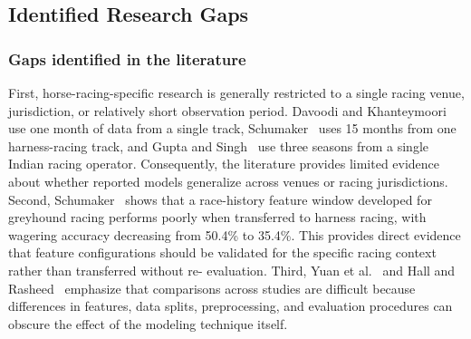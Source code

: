 \subsection{Identified Research Gaps}
\label{sec:brechas}

\subsubsection*{\textbf{Gaps identified in the literature}} First, horse-racing-specific research is
generally restricted to a single racing venue, jurisdiction, or relatively short
observation period. Davoodi and Khanteymoori~\cite{ejeA_davoodi2010} use one month
of data from a single track, Schumaker~\cite{ejeA_schumaker2018} uses 15 months
from one harness-racing track, and Gupta and Singh~\cite{ejeA_gupta2023,ejeA_gupta2024b}
use three seasons from a single Indian racing operator. Consequently, the
literature provides limited evidence about whether reported models generalize
across venues or racing jurisdictions. Second, Schumaker~\cite{ejeA_schumaker2018}
shows that a race-history feature window developed for greyhound racing performs
poorly when transferred to harness racing, with wagering accuracy decreasing from
50.4\% to 35.4\%. This provides direct evidence that feature configurations should
be validated for the specific racing context rather than transferred without re-
evaluation. Third, Yuan et al.~\cite{ejeB_yuan2025} and Hall and Rasheed~\cite{ejeB_hall2025}
emphasize that comparisons across studies are difficult because differences in
features, data splits, preprocessing, and evaluation procedures can obscure the
effect of the modeling technique itself.

